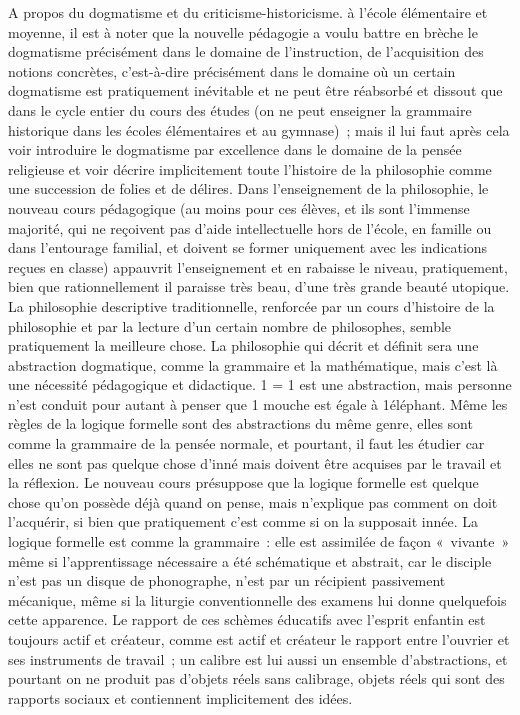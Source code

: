 \documentclass[french,twoside]{book} %
\begin{document}
A propos du dogmatisme et du criticisme-historicisme. à l’école élémentaire et moyenne, il est à noter que la nouvelle pédagogie a voulu battre en brèche le dogmatisme précisément dans le domaine de l’instruction, de l’acquisition des notions concrètes, c’est-à-dire précisément dans le domaine où un certain dogmatisme est pratiquement inévitable et ne peut être réabsorbé et dissout que dans le cycle entier du cours des études (on ne peut enseigner la grammaire historique dans les écoles élémentaires et au gymnase) ; mais il lui faut après cela voir introduire le dogmatisme par excellence dans le domaine de la pensée religieuse et voir décrire implicitement toute l’histoire de la philosophie comme une succession de folies et de délires. Dans l’enseignement de la philosophie, le nouveau cours pédagogique (au moins pour ces élèves, et ils sont l’immense majorité, qui ne reçoivent pas d’aide intellectuelle hors de l’école, en famille ou dans l’entourage familial, et doivent se former uniquement avec les indications reçues en classe) appauvrit l’enseignement et en rabaisse le niveau, pratiquement, bien que rationnellement il paraisse très beau, d’une très grande beauté utopique. La philosophie descriptive traditionnelle, renforcée par un cours d’histoire de la philosophie et par la lecture d’un certain nombre de philosophes, semble pratiquement la meilleure chose. La philosophie qui décrit et définit sera une abstraction dogmatique, comme la grammaire et la mathématique, mais c’est là une nécessité pédagogique et didactique. 1 = 1 est une abstraction, mais personne n’est conduit pour autant à penser que 1 mouche est égale à 1éléphant. Même les règles de la logique formelle sont des abstractions du même genre, elles sont comme la grammaire de la pensée normale, et pourtant, il faut les étudier car elles ne sont pas quelque chose d’inné mais doivent être acquises par le travail et la réflexion. Le nouveau cours présuppose que la logique formelle est quelque chose qu’on possède déjà quand on pense, mais n’explique pas comment on doit l’acquérir, si bien que pratiquement c’est comme si on la supposait innée. La logique formelle est comme la grammaire : elle est assimilée de façon « vivante » même si l’apprentissage nécessaire a été schématique et abstrait, car le disciple n’est pas un disque de phonographe, n’est par un récipient passivement mécanique, même si la liturgie conventionnelle des examens lui donne quelquefois cette apparence. Le rapport de ces schèmes éducatifs avec l’esprit enfantin est toujours actif et créateur, comme est actif et créateur le rapport entre l’ouvrier et ses instruments de travail ; un calibre est lui aussi un ensemble d’abstractions, et pourtant on ne produit pas d’objets réels sans calibrage, objets réels qui sont des rapports sociaux et contiennent implicitement des idées.\par
\end{document}
